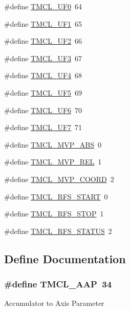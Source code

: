 \begin{DoxyCompactItemize}
\item 
\#define \hyperlink{group__TMCLComm_ga452f379acd2362b3694cc2332a2ad4c0}{TMCL\_\-UF0}~64
\item 
\#define \hyperlink{group__TMCLComm_ga04c7b2800e3c01ac91161f7f680ecea0}{TMCL\_\-UF1}~65
\item 
\#define \hyperlink{group__TMCLComm_ga91dd885d4a0e3d69623d4323ca1d64df}{TMCL\_\-UF2}~66
\item 
\#define \hyperlink{group__TMCLComm_gae6e8731e90f75bc9b1218560f3640926}{TMCL\_\-UF3}~67
\item 
\#define \hyperlink{group__TMCLComm_ga24ceb335f6461de5fb3c2bd27cbb7823}{TMCL\_\-UF4}~68
\item 
\#define \hyperlink{group__TMCLComm_ga76c1ecb8e0999fac3d42b5ae4e8cc076}{TMCL\_\-UF5}~69
\item 
\#define \hyperlink{group__TMCLComm_gab5c21ab342d5fd4f5df3f5a0b286ccd1}{TMCL\_\-UF6}~70
\item 
\#define \hyperlink{group__TMCLComm_gaf16a383aac035a9bcf695ecd66ca8df2}{TMCL\_\-UF7}~71
\item 
\#define \hyperlink{group__TMCLComm_gafb1f96d5d46a081eaafdf4d8172e5417}{TMCL\_\-MVP\_\-ABS}~0
\item 
\#define \hyperlink{group__TMCLComm_gabb48ea6fc019299ba3081da7be7a1cdb}{TMCL\_\-MVP\_\-REL}~1
\item 
\#define \hyperlink{group__TMCLComm_gab1bd55bf2087a0fa580a7ed196b731b2}{TMCL\_\-MVP\_\-COORD}~2
\item 
\#define \hyperlink{group__TMCLComm_ga8ecbfcad4ab934cc6b3b4c90f07a5ba6}{TMCL\_\-RFS\_\-START}~0
\item 
\#define \hyperlink{group__TMCLComm_gadad6e89adaf4b2c93c8afd785b3aeb29}{TMCL\_\-RFS\_\-STOP}~1
\item 
\#define \hyperlink{group__TMCLComm_gadc8231e2815a936cb84f36f75da3ca02}{TMCL\_\-RFS\_\-STATUS}~2
\end{DoxyCompactItemize}


\subsection{Define Documentation}
\hypertarget{group__TMCLComm_gadda3b3b029a3c196e05bc3fbb6e9f4c0}{
\subsubsection[{TMCL\_\-AAP}]{\setlength{\rightskip}{0pt plus 5cm}\#define TMCL\_\-AAP~34}}
\label{group__TMCLComm_gadda3b3b029a3c196e05bc3fbb6e9f4c0}
Accumulator to Axis Parameter 

